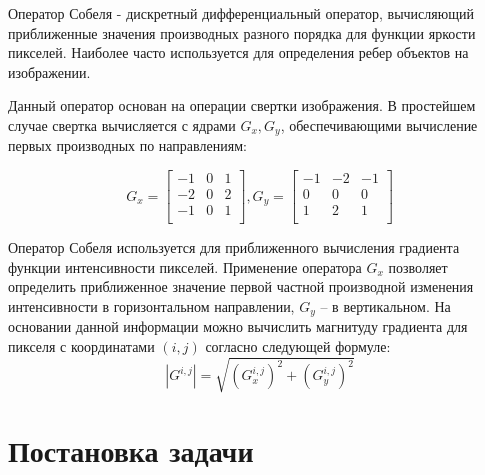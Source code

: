 \documentclass[14pt, a4paper]{extreport}
\begin{document}
Оператор Собеля - дискретный дифференциальный оператор, вычисляющий приближенные значения производных разного порядка для функции яркости пикселей. Наиболее часто используется для определения ребер объектов на изображении.

Данный оператор основан на операции свертки изображения. В простейшем случае свертка вычисляется с ядрами \begin{math}G_x, G_y\end{math}, обеспечивающими вычисление первых производных по направлениям:

\begin{equation}
G_x=
\left[
  \begin{array}{ccc}
    -1 & 0 & 1 \\
     -2 & 0 & 2 \\
     -1 & 0 & 1\\
  \end{array}
\right]
,G_y=
\left[
  \begin{array}{ccc}
    -1 & -2 & -1 \\
     0 & 0 & 0 \\
     1 & 2 & 1\\
  \end{array}
\right]
\end{equation}

Оператор Собеля используется для приближенного вычисления градиента функции интенсивности пикселей. Применение оператора  \begin{math}G_x\end{math}  позволяет определить приближенное значение первой частной производной изменения интенсивности в горизонтальном направлении, \begin{math}G_y\end{math} – в вертикальном. На основании данной информации можно вычислить магнитуду градиента для пикселя с координатами \begin{math}(i,j)\end{math} согласно следующей формуле:  \begin{equation}|G^{i,j}|=\sqrt{(G^{i,j}_x)^2+(G^{i,j}_y)^2}\end{equation}
\newpage 

\section*{Постановка задачи}
\end{document}
